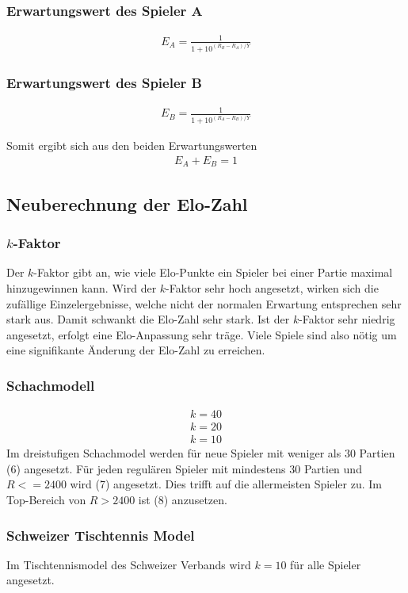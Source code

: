 \documentclass[a4paper, 12pt]{article}
\newcounter{arti}
\begin{document}
\subsubsection{Erwartungswert des Spieler A}
\begin{align}
E_{A} = \frac{1}{1+10^{(R_{B}-R_{A})/Y}}
\end{align}

\subsubsection{Erwartungswert des Spieler B}
\begin{align}
E_{B} = \frac{1}{1+10^{(R_{A}-R_{B})/Y}}
\end{align}

Somit ergibt sich aus den beiden Erwartungswerten
\begin{align}
E_A + E_B = 1
\end{align}

\subsection{Neuberechnung der Elo-Zahl}
\subsubsection{\(k\)-Faktor}
Der \(k\)-Faktor gibt an, wie viele Elo-Punkte ein Spieler bei einer Partie maximal hinzugewinnen kann.
Wird der \(k\)-Faktor sehr hoch angesetzt, wirken sich die zufällige Einzelergebnisse, welche nicht der normalen Erwartung entsprechen sehr stark aus. Damit schwankt die Elo-Zahl sehr stark.
Ist der \(k\)-Faktor sehr niedrig angesetzt, erfolgt eine Elo-Anpassung sehr träge. Viele Spiele sind also nötig um eine signifikante Änderung der Elo-Zahl zu erreichen.
\subsubsection{Schachmodell}
\begin{align}
k=40
\\k=20
\\k=10
\end{align}
Im dreistufigen Schachmodel werden für neue Spieler mit weniger als 30 Partien (6) angesetzt.
Für jeden regulären Spieler mit mindestens 30 Partien und \(R <= 2400\) wird (7) angesetzt. Dies trifft auf die allermeisten Spieler zu.
Im Top-Bereich von \(R > 2400 \) ist (8) anzusetzen.
\subsubsection{Schweizer Tischtennis Model}
Im Tischtennismodel des Schweizer Verbands wird \(k=10\) für alle Spieler angesetzt.
\end{document}
